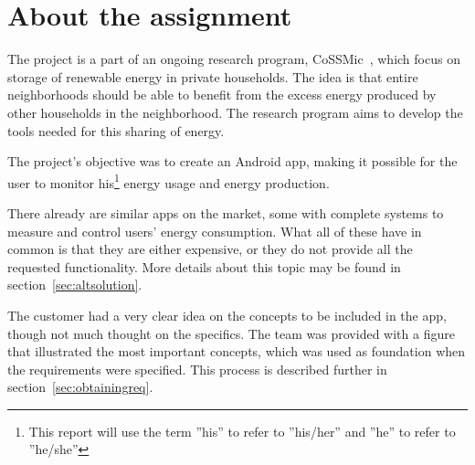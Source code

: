 \section{About the assignment}

The project is a part of an ongoing research program, CoSSMic~\cite{cossmic}, which focus on storage of renewable energy in private households. 
The idea is that entire neighborhoods should be able to benefit from the excess energy produced by other households in the neighborhood. 
The research program aims to develop the tools needed for this sharing of energy. 

The project's objective was to create an Android app, making it possible for the user to monitor his\footnote{This report will use the term ''his'' to refer to ''his/her'' and ''he'' to refer to ''he/she''} 
energy usage and energy production. 

There already are similar apps on the market, some with complete systems to measure and control users' energy consumption. 
What all of these have in common is that they are either expensive, or they do not provide all the requested functionality. More details about this topic may be found in section~\ref{sec:altsolution}.

The customer had a very clear idea on the concepts to be included in the app, though not much thought on the specifics. The team was provided with a figure that illustrated the most important concepts, which was used as foundation when the requirements were specified. 
This process is described further in section~\ref{sec:obtainingreq}.